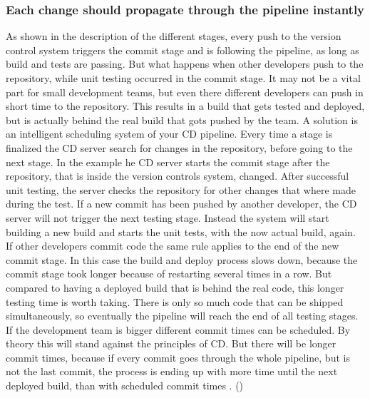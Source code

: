 \subsubsection{Each change should propagate through the pipeline instantly}
As shown in the description of the different stages, every push to the version control system triggers the commit stage and is following the pipeline, as long as
build and tests are passing. But what happens when other developers push to the repository, while unit testing occurred in the commit stage. It may not be a vital
part for small development teams, but even there different developers can push in short time to the repository. This results
in a build that gets tested and deployed, but is actually behind the real build that gots pushed by the team. A solution is an intelligent scheduling
system of your CD pipeline. Every time a stage is finalized the CD server search for changes in the repository, before going to the next stage. In the
example he CD server starts the commit stage after the repository, that is inside the version controls system, changed. After successful unit
testing, the server checks the repository for other changes that where made during the test. If a new commit has been pushed by another developer,
the CD server will not trigger the next testing stage. Instead the system will start building a new build and starts the unit tests, with the now actual build, again.
If other developers commit code the same rule applies to the end of the new commit stage. In this case the build and deploy process slows down, because the commit stage
took longer because of restarting several times in a row. But compared to having a deployed build that is behind the real code, this longer testing time is worth taking.
There is only so much code that can be shipped simultaneously, so eventually the pipeline will reach the end of all testing stages. If the development team is bigger
different commit times can be scheduled. By theory this will stand against the principles of CD. But there will be longer commit times, because if every commit goes through
the whole pipeline, but is not the last commit, the process is ending up with more time until the next deployed build, than with scheduled commit times .
(\cite{humble2010continuous})

